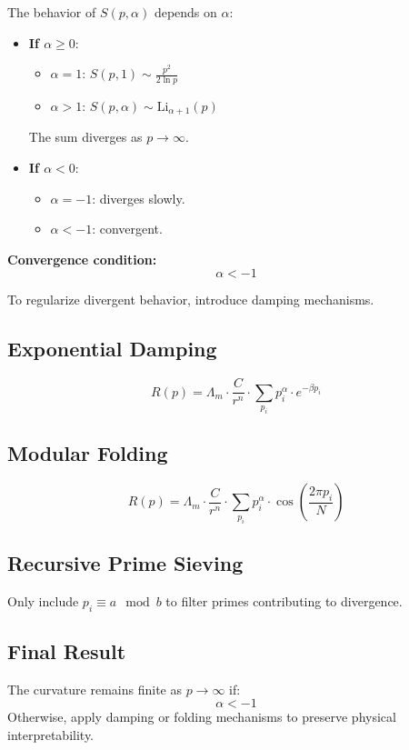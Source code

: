 \documentclass[12pt]{article}
\theoremstyle{plain}
\begin{document}
The behavior of \( S(p, \alpha) \) depends on \( \alpha \):
\begin{itemize}
    \item \textbf{If \( \alpha \geq 0 \)}:
    \begin{itemize}
        \item \( \alpha = 1 \): \( S(p, 1) \sim \frac{p^2}{2 \ln p} \)
        \item \( \alpha > 1 \): \( S(p, \alpha) \sim \mathrm{Li}_{\alpha+1}(p) \)
    \end{itemize}
    The sum diverges as \( p \to \infty \).
    
    \item \textbf{If \( \alpha < 0 \)}:
    \begin{itemize}
        \item \( \alpha = -1 \): diverges slowly.
        \item \( \alpha < -1 \): convergent.
    \end{itemize}
\end{itemize}

\textbf{Convergence condition:}
\[
\alpha < -1
\]

To regularize divergent behavior, introduce damping mechanisms.

\subsection{Exponential Damping}
\[
R(p) = \Lambda_m \cdot \frac{C}{r^n} \cdot \sum_{p_i} p_i^\alpha \cdot e^{-\beta p_i}
\]

\subsection{Modular Folding}
\[
R(p) = \Lambda_m \cdot \frac{C}{r^n} \cdot \sum_{p_i} p_i^\alpha \cdot \cos\left(\frac{2\pi p_i}{N}\right)
\]

\subsection{Recursive Prime Sieving}
Only include \( p_i \equiv a \mod b \) to filter primes contributing to divergence.

\subsection{Final Result}
The curvature remains finite as \( p \to \infty \) if:
\[
\boxed{\alpha < -1}
\]
Otherwise, apply damping or folding mechanisms to preserve physical interpretability.
\end{document}
